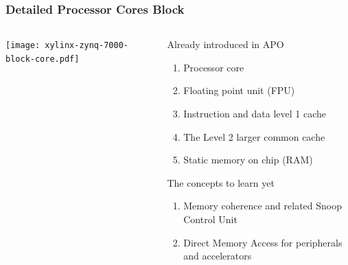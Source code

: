 \documentclass{beamer}
\begin{document}
\begin{frame}
\frametitle{Detailed Processor Cores Block}
\begin{columns}
\begin{column}{0.6\textwidth}
  \begin{center}
    \texttt{[image: xylinx-zynq-7000-block-core.pdf]}
  \end{center}
  \vfil
\end{column}
\begin{column}{0.4\textwidth}
 {
 \footnotesize
 Already introduced in APO
 \begin{enumerate}
  \item Processor core
  \item Floating point unit (FPU)
  \item Instruction and data level 1 cache
  \item The Level 2 larger common cache
  \item Static memory on chip (RAM)
 \end{enumerate}
 The concepts to learn yet
 \begin{enumerate}
  \item Memory coherence and related Snoop Control Unit
  \item Direct Memory Access for peripherals and accelerators
 \end{enumerate}
 }
\end{column}
\end{columns}
\end{frame}
\end{document}
